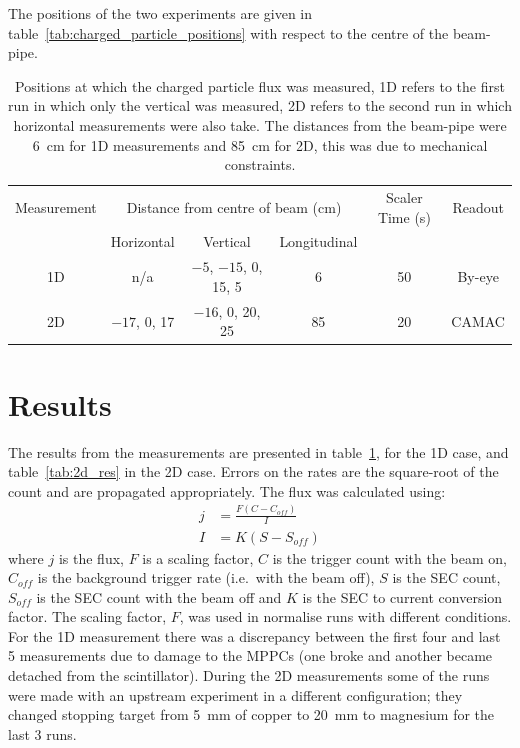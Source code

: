 The positions of the two experiments are given in table~\ref{tab:charged_particle_positions} with respect to the centre of the beam-pipe.
\begin{table}
    \begin{center}
    \begin{tabular}{c|c|c|c|c|c}
        Measurement  &  \multicolumn{3}{c|}{Distance from centre of beam (cm)}         &  Scaler Time (s)  &  Readout \\
                     &    Horizontal    &       Vertical              &  Longitudinal  &                   &          \\
        \hline            
        1D           &  n/a             &  \(-5\), \(-15\), 0, 15, 5  &       6        &  50               & By-eye   \\
        2D           &  \(-17\), 0, 17  &  \(-16\), 0, 20, 25         &       85       &  20               & CAMAC    \\
    \end{tabular}
    \end{center}
    \caption{Positions at which the charged particle flux was measured, 1D refers to the first run in which only the vertical was measured, 2D refers to the second run in which horizontal measurements were also take. The distances from the beam-pipe were 6~cm for 1D measurements and 85~cm for 2D, this was due to mechanical constraints.}
    \label{tab:1d_res}
\end{table}

\section{Results} %
\label{sec:results}

The results from the measurements are presented in table~\ref{tab:1d_res}, for the 1D case, and table~\ref{tab:2d_res} in the 2D case. Errors on the rates are the square-root of the count and are propagated appropriately. The flux was calculated using:
\begin{align}
    j &= \frac{F(C - C_{off})}{I} \\
    I &= K(S - S_{off})
\end{align}
where \(j\) is the flux, \(F\) is a scaling factor, \(C\) is the trigger count with the beam on, \(C_{off}\) is the background trigger rate (i.e.\ with the beam off), \(S\) is the SEC count, \(S_{off}\) is the SEC count with the beam off and \(K\) is the SEC to current conversion factor. The scaling factor, \(F\), was  used in normalise runs with different conditions. For the 1D measurement there was a discrepancy between the first four and last 5 measurements due to damage to the MPPCs (one broke and another became detached from the scintillator). During the 2D measurements some of the runs were made with an upstream experiment in a different configuration; they changed stopping target from 5~mm of copper to 20~mm to magnesium for the last 3 runs.

